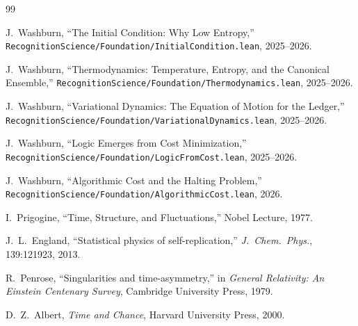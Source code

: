 \documentclass[11pt,a4paper]{article}
\theoremstyle{plain}
\theoremstyle{definition}
\theoremstyle{remark}
\begin{document}
\bigskip

\begin{thebibliography}{99}

J.~Washburn, ``The Initial Condition: Why Low Entropy,'' \texttt{RecognitionScience/Foundation/InitialCondition.lean}, 2025--2026.

J.~Washburn, ``Thermodynamics: Temperature, Entropy, and the Canonical Ensemble,'' \texttt{RecognitionScience/Foundation/Thermodynamics.lean}, 2025--2026.

J.~Washburn, ``Variational Dynamics: The Equation of Motion for the Ledger,'' \texttt{RecognitionScience/Foundation/VariationalDynamics.lean}, 2025--2026.

J.~Washburn, ``Logic Emerges from Cost Minimization,'' \texttt{RecognitionScience/Foundation/LogicFromCost.lean}, 2025--2026.

J.~Washburn, ``Algorithmic Cost and the Halting Problem,'' \texttt{RecognitionScience/Foundation/AlgorithmicCost.lean}, 2026.

I.~Prigogine, ``Time, Structure, and Fluctuations,'' Nobel Lecture, 1977.

J.~L.~England, ``Statistical physics of self-replication,'' \emph{J.~Chem.~Phys.}, 139:121923, 2013.

R.~Penrose, ``Singularities and time-asymmetry,'' in \emph{General Relativity: An Einstein Centenary Survey}, Cambridge University Press, 1979.

D.~Z.~Albert, \emph{Time and Chance}, Harvard University Press, 2000.

\end{thebibliography}
\end{document}
